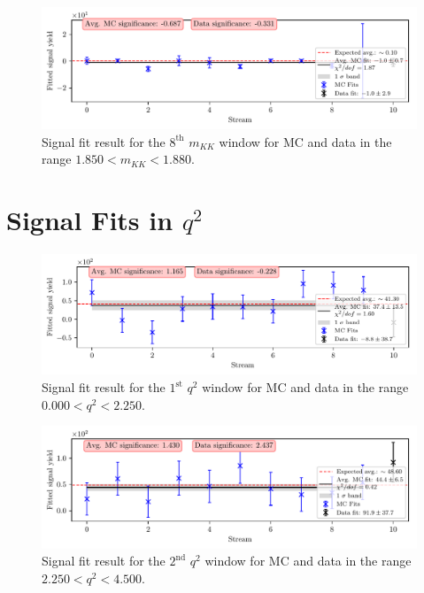 \begin{figure}[H]
	\centering
	\captionsetup{width=0.8\linewidth}
	\includegraphics[width=\linewidth]{fig/sig_mKK_8}
	\caption{Signal fit result for the $8^{\mathrm{th}}$ $m_{KK}$ window for MC and data in the range $1.850  < m_{KK} < 1.880$.}
\end{figure}


\section{Signal Fits in \texorpdfstring{$q^2$}{q2}}
\label{sec:q2_plots}
\begin{figure}[H]
	\centering
	\captionsetup{width=0.8\linewidth}
	\includegraphics[width=\linewidth]{fig/sig_q2_1}
	\caption{Signal fit result for the $1^{\mathrm{st}}$ $q^2$ window for MC and data in the range $0.000  < q^2 < 2.250$.}
\end{figure} 

\begin{figure}[H]
	\centering
	\captionsetup{width=0.8\linewidth}
	\includegraphics[width=\linewidth]{fig/sig_q2_2}
	\caption{Signal fit result for the $2^{\mathrm{nd}}$ $q^2$ window for MC and data in the range $2.250  < q^2 < 4.500$.}
\end{figure}

